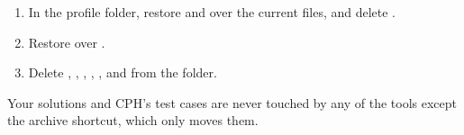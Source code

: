 \begin{enumerate}
  \item In the profile folder, restore  and
         over the current files, and delete
        .
  \item Restore  over .
  \item Delete , , , , ,  and
         from the folder.
\end{enumerate}
Your solutions and CPH's test cases are never touched by any of the tools except the archive shortcut, which only
moves them.
